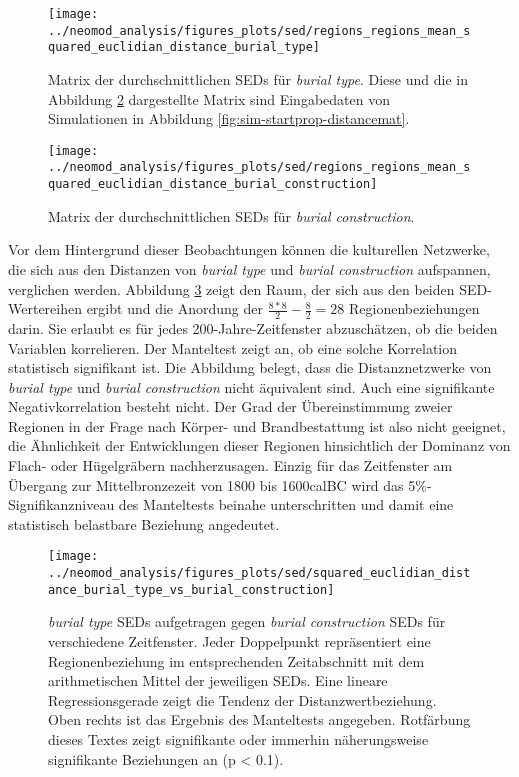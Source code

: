 \documentclass[openany,twoside,twocolumn]{book}
\begin{document}
\begin{figure}
\texttt{[image: ../neomod\_analysis/figures\_plots/sed/regions\_regions\_mean\_squared\_euclidian\_distance\_burial\_type]} \caption[Matrix der durchschnittlichen SEDs für \textit{burial type}]{Matrix der durchschnittlichen SEDs für \textit{burial type}. Diese und die in Abbildung \ref{fig:sed-mean-matrix-bc} dargestellte Matrix sind Eingabedaten von Simulationen in Abbildung \ref{fig:sim-startprop-distancemat}.}\label{fig:sed-mean-matrix-bt}
\end{figure}

\begin{figure}
\texttt{[image: ../neomod\_analysis/figures\_plots/sed/regions\_regions\_mean\_squared\_euclidian\_distance\_burial\_construction]} \caption[Matrix der durchschnittlichen SEDs für \textit{burial construction}]{Matrix der durchschnittlichen SEDs für \textit{burial construction}.}\label{fig:sed-mean-matrix-bc}
\end{figure}

Vor dem Hintergrund dieser Beobachtungen können die kulturellen Netzwerke, die sich aus den Distanzen von \emph{burial type} und \emph{burial construction} aufspannen, verglichen werden. Abbildung \ref{fig:mantel-bt-bc} zeigt den Raum, der sich aus den beiden SED-Wertereihen ergibt und die Anordung der \(\frac{8*8}{2}-\frac{8}{2}=28\) Regionenbeziehungen darin. Sie erlaubt es für jedes 200-Jahre-Zeitfenster abzuschätzen, ob die beiden Variablen korrelieren. Der Manteltest zeigt an, ob eine solche Korrelation statistisch signifikant ist. Die Abbildung belegt, dass die Distanznetzwerke von \emph{burial type} und \emph{burial construction} nicht äquivalent sind. Auch eine signifikante Negativkorrelation besteht nicht. Der Grad der Übereinstimmung zweier Regionen in der Frage nach Körper- und Brandbestattung ist also nicht geeignet, die Ähnlichkeit der Entwicklungen dieser Regionen hinsichtlich der Dominanz von Flach- oder Hügelgräbern nachherzusagen. Einzig für das Zeitfenster am Übergang zur Mittelbronzezeit von 1800 bis 1600calBC wird das 5\%-Signifikanzniveau des Manteltests beinahe unterschritten und damit eine statistisch belastbare Beziehung angedeutet.

\begin{landscape}
\begin{figure}
\texttt{[image: ../neomod\_analysis/figures\_plots/sed/squared\_euclidian\_distance\_burial\_type\_vs\_burial\_construction]} \caption[\textit{burial type} SEDs aufgetragen gegen \textit{burial construction} SEDs]{\textit{burial type} SEDs aufgetragen gegen \textit{burial construction} SEDs für verschiedene Zeitfenster. Jeder Doppelpunkt repräsentiert eine Regionenbeziehung im entsprechenden Zeitabschnitt mit dem arithmetischen Mittel der jeweiligen SEDs. Eine lineare Regressionsgerade zeigt die Tendenz der Distanzwertbeziehung. Oben rechts ist das Ergebnis des Manteltests angegeben. Rotfärbung dieses Textes zeigt signifikante oder immerhin näherungsweise signifikante Beziehungen an (p < 0.1).}\label{fig:mantel-bt-bc}
\end{figure}
\end{landscape}
\end{document}
